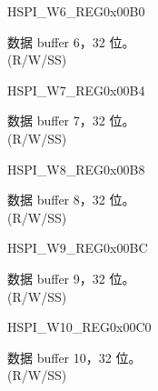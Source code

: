 \begin{register}{H}{SPI\_W6\_REG}{0x00B0}\label{regdesc:SPI3W6REG}
%
\regnewline%
\begin{regdesc}\begin{reglist}
\label{fielddesc:SPI3BUF6}\item [SPI\_BUF6] 数据 buffer 6，32 位。\\
(R/W/SS)
\end{reglist}\end{regdesc}
\end{register}


\begin{register}{H}{SPI\_W7\_REG}{0x00B4}\label{regdesc:SPI3W7REG}
%
\regnewline%
\begin{regdesc}\begin{reglist}
\label{fielddesc:SPI3BUF7}\item [SPI\_BUF7] 数据 buffer 7，32 位。\\
(R/W/SS)
\end{reglist}\end{regdesc}
\end{register}


\begin{register}{H}{SPI\_W8\_REG}{0x00B8}\label{regdesc:SPI3W8REG}
%
\regnewline%
\begin{regdesc}\begin{reglist}
\label{fielddesc:SPI3BUF8}\item [SPI\_BUF8] 数据 buffer 8，32 位。\\
(R/W/SS)
\end{reglist}\end{regdesc}
\end{register}


\begin{register}{H}{SPI\_W9\_REG}{0x00BC}\label{regdesc:SPI3W9REG}
%
\regnewline%
\begin{regdesc}\begin{reglist}
\label{fielddesc:SPI3BUF9}\item [SPI\_BUF9] 数据 buffer 9，32 位。\\
(R/W/SS)
\end{reglist}\end{regdesc}
\end{register}


\begin{register}{H}{SPI\_W10\_REG}{0x00C0}\label{regdesc:SPI3W10REG}
%
\regnewline%
\begin{regdesc}\begin{reglist}
\label{fielddesc:SPI3BUF10}\item [SPI\_BUF10] 数据 buffer 10，32 位。\\
(R/W/SS)
\end{reglist}\end{regdesc}
\end{register}


